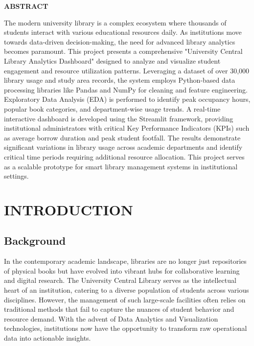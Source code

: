 \documentclass[12pt,a4paper]{report}
\begin{document}
\newpage
\begin{center}
    {\Large \textbf{ABSTRACT}\par}
\end{center}
\vspace{1cm}
The modern university library is a complex ecosystem where thousands of students interact with various educational resources daily. As institutions move towards data-driven decision-making, the need for advanced library analytics becomes paramount. This project presents a comprehensive "University Central Library Analytics Dashboard" designed to analyze and visualize student engagement and resource utilization patterns. Leveraging a dataset of over 30,000 library usage and study area records, the system employs Python-based data processing libraries like Pandas and NumPy for cleaning and feature engineering. Exploratory Data Analysis (EDA) is performed to identify peak occupancy hours, popular book categories, and department-wise usage trends. A real-time interactive dashboard is developed using the Streamlit framework, providing institutional administrators with critical Key Performance Indicators (KPIs) such as average borrow duration and peak student footfall. The results demonstrate significant variations in library usage across academic departments and identify critical time periods requiring additional resource allocation. This project serves as a scalable prototype for smart library management systems in institutional settings.

\tableofcontents
\listoffigures
\listoftables

\chapter{INTRODUCTION}
\section{Background}
In the contemporary academic landscape, libraries are no longer just repositories of physical books but have evolved into vibrant hubs for collaborative learning and digital research. The University Central Library serves as the intellectual heart of an institution, catering to a diverse population of students across various disciplines. However, the management of such large-scale facilities often relies on traditional methods that fail to capture the nuances of student behavior and resource demand. With the advent of Data Analytics and Visualization technologies, institutions now have the opportunity to transform raw operational data into actionable insights.
\end{document}
